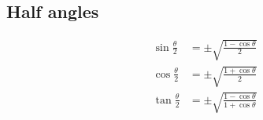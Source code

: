 \subsection*{Half angles}

\begin{align*}
  \sin \frac{\theta}{2}  &= \pm \sqrt{ \frac{1 - \cos \theta }{2} }\\
  \cos \frac{\theta}{2}  &= \pm \sqrt{ \frac{1 + \cos \theta }{2} }\\
  \tan \frac{\theta}{2}  &= \pm \sqrt{ \frac{1 - \cos \theta }{1 + \cos \theta}}
\end{align*}